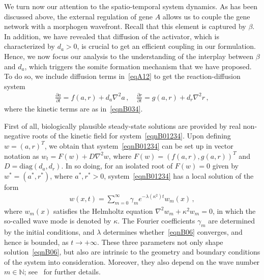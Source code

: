 \documentclass[%
 preprint,
 aip, 
 amsmath,amssymb,
]{revtex4-2}
\begin{document}
We turn now our attention to the spatio-temporal system dynamics. As has been discussed above, the external regulation of gene $A$ allows us to couple the gene network with a morphogen wavefront. Recall that this element is captured by $\beta$. In addition, we have revealed that diffusion of the activator, which is characterized by $d_a>0$, is crucial to get an efficient coupling in our formulation. Hence, we now focus our analysis to the understanding of the interplay between $\beta$ and $d_a$, which triggers the somite formation mechanism that we have proposed. To do so, we include diffusion terms in~\eqref{eqA12} to get the reaction-diffusion system
		\begin{gather}\label{eqnB01234}
		\frac{\partial{a}}{\partial{t}}= f(a,r)+d_a\nabla^2a\,, \quad \frac{\partial{r}}{\partial{t}} = g(a,r)+d_r\nabla^2r\,,%
		\end{gather}
		where the kinetic terms are as in~\eqref{eqnB034}. 

First of all, biologically plausible steady-state solutions are provided by real non-negative roots of the kinetic field for system~\eqref{eqnB01234}. Upon defining $w=(a,r)^T$, we obtain that system~\eqref{eqnB01234} can be set up in vector notation as $w_t = F(w) + D \nabla^2 w$, where
	$F(w) = \left(f(a,r),g(a,r)\right)^T$ and $D=\textrm{diag}\left(d_a, d_r \right)$. In so doing, for an isolated root of $F(w)=0$ given by $w^*=(a^*,r^*)$, where $a^*,r^*>0$, system~\eqref{eqnB01234} has a local solution of the form 
	\begin{gather}\label{eqnB06}
	w(x,t)= \sum_{m=0}^{\infty}\gamma_me^{-\lambda\left(\kappa^2\right) t}w_m(x)\,,%
	\end{gather}
	where $w_m(x)$ satisfies the Helmholtz equation $\nabla^2w_m+\kappa^2w_m=0$, in which the so-called wave mode is denoted by $\kappa$. The Fourier coefficients $\gamma_m$ are determined by the initial conditions, and $\lambda$ determines whether~\eqref{eqnB06} converges, and hence is bounded, as $t\to+\infty$. These three parameters not only shape solution~\eqref{eqnB06}, but also are intrinsic to the geometry and boundary conditions of the system into consideration. Moreover, they also depend on the wave number $m\in\mathbb{N}$; see~\cite{Murray1989} for further details. 
\end{document}
